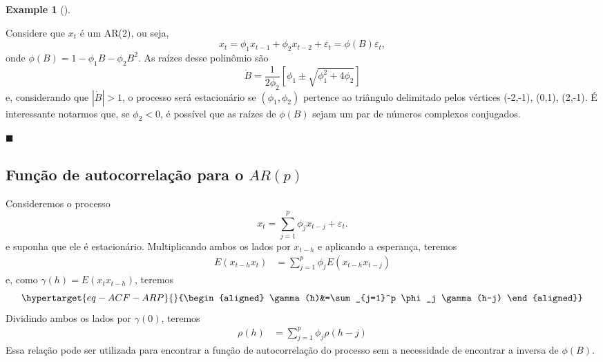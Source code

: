 \documentclass[
  letterpaper,
  DIV=11,
  numbers=noendperiod]{scrartcl}
\theoremstyle{plain}
\theoremstyle{plain}
\theoremstyle{definition}
\newtheorem{example}{Example}[chapter]
\theoremstyle{definition}
\theoremstyle{remark}
\begin{document}
\begin{example}[]\protect\hypertarget{exm-}{}\label{exm-}

Considere que \(x_t\) é um AR(\(2\)), ou seja,
\[x_t=\phi_1 x_{t-1}+\phi_2 x_{t-2}+\varepsilon_t=\phi(B)\varepsilon_t,\]
onde \(\phi(B)=1-\phi_1B-\phi_2 B^2\). As raízes desse polinômio são
\[\dot{B}=\frac{1}{2\phi_2}\left[\phi_1\pm\sqrt{\phi_1^2+4\phi_2}\right]\]
e, considerando que \(|\dot{B}|>1\), o processo será estacionário se
\((\phi_1,\phi_2)\) pertence ao triângulo delimitado pelos vértices
(-2,-1), (0,1), (2,-1). É interessante notarmos que, se \(\phi_2<0\), é
possível que as raízes de \(\phi(B)\) sejam um par de números complexos
conjugados.

\(\blacksquare\)

\end{example}

\hypertarget{funuxe7uxe3o-de-autocorrelauxe7uxe3o-para-o-arp}{%
\subsection{\texorpdfstring{Função de autocorrelação para o
\(AR(p)\)}{Função de autocorrelação para o AR(p)}}\label{funuxe7uxe3o-de-autocorrelauxe7uxe3o-para-o-arp}}

Consideremos o processo
\[x_t = \sum_{j=1}^p\phi_j x_{t-j}+\varepsilon_t.\] e suponha que ele é
estacionário. Multiplicando ambos os lados por \(x_{t-h}\) e aplicando a
esperança, teremos \[\begin{align}
E(x_{t-h}x_t)&=\sum_{j=1}^p \phi_j E(x_{t-h}x_{
t-j})
\end{align}\] e, como \(\gamma(h)=E(x_t x_{t-h})\), teremos
\begin{equation}\protect\hypertarget{eq-ACF-ARP}{}{\begin{align}
\gamma(h)&=\sum_{j=1}^p \phi_j \gamma(h-j)
\end{align}}\label{eq-ACF-ARP}\end{equation} Dividindo ambos os lados
por \(\gamma(0)\), teremos \[\begin{align}
\rho(h)&=\sum_{j=1}^p \phi_j \rho(h-j)
\end{align}\] Essa relação pode ser utilizada para encontrar a função de
autocorrelação do processo sem a necessidade de encontrar a inversa de
\(\phi(B)\).
\end{document}
